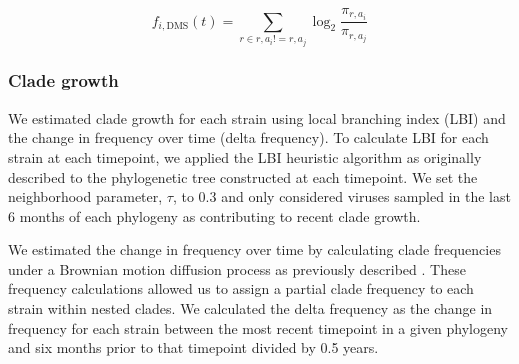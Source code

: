 \begin{equation}
    f_{i,\mathrm{DMS}}(t) = \sum_{r \in r,a_{i} != r,a_{j}}\log_{2}\frac{\pi_{r,a_{i}}}{\pi_{r,a_{j}}}
    \label{equation_mutational_preference}
\end{equation}

\subsubsection*{Clade growth}

We estimated clade growth for each strain using local branching index (LBI) and the change in frequency over time (delta frequency).
To calculate LBI for each strain at each timepoint, we applied the LBI heuristic algorithm as originally described \cite{Neher:2014eu} to the phylogenetic tree constructed at each timepoint.
We set the neighborhood parameter, $\tau$, to 0.3 and only considered viruses sampled in the last 6 months of each phylogeny as contributing to recent clade growth.

We estimated the change in frequency over time by calculating clade frequencies under a Brownian motion diffusion process as previously described \cite{Lee2018}.
These frequency calculations allowed us to assign a partial clade frequency to each strain within nested clades.
We calculated the delta frequency as the change in frequency for each strain between the most recent timepoint in a given phylogeny and six months prior to that timepoint divided by 0.5 years.
